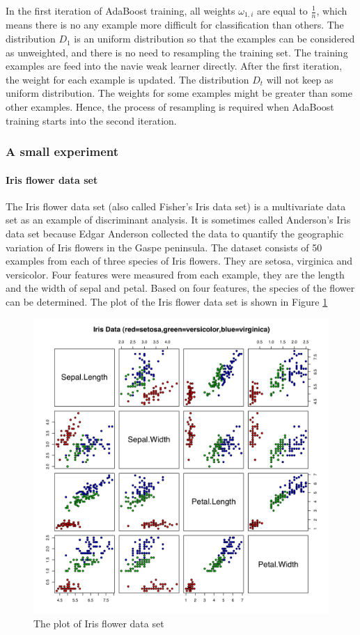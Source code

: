 In the first iteration of AdaBoost training, all weights $\omega_{1,i}$ are equal to $\frac{1}{n}$, which means there is no any example more difficult for classification than others. The distribution $D_{1}$ is an uniform distribution so that the examples can be considered as unweighted, and there is no need to resampling the training set. The training examples are feed into the navie weak learner directly. After the first iteration, the weight for each example is updated. The distribution $D_{t}$ will not keep as uniform distribution. The weights for some examples might be greater than some other examples. Hence, the process of resampling is required when AdaBoost training starts into the second iteration.
\subsubsection{A small experiment}

\paragraph{Iris flower data set}
The Iris flower data set (also called Fisher's Iris data set) is a multivariate data set as an example of discriminant analysis. It is sometimes called Anderson's Iris data set because Edgar Anderson collected the data to quantify the geographic variation of Iris flowers in the Gaspe peninsula. The dataset consists of 50 examples from each of three species of Iris flowers. They are setosa, virginica and versicolor. Four features were measured from each example, they are the length and the width of sepal and petal. 
Based on four features, the species of the flower can be determined.  The plot of the Iris flower data set is shown in \mbox{Figure} \ref{fig:irisdata}
\begin{figure}
 \includegraphics[width=\textwidth]{ch4/figures/Anderson's_Iris_data_set.png}
\caption{The plot of Iris flower data set}
\label{fig:irisdata}
\end{figure} 
